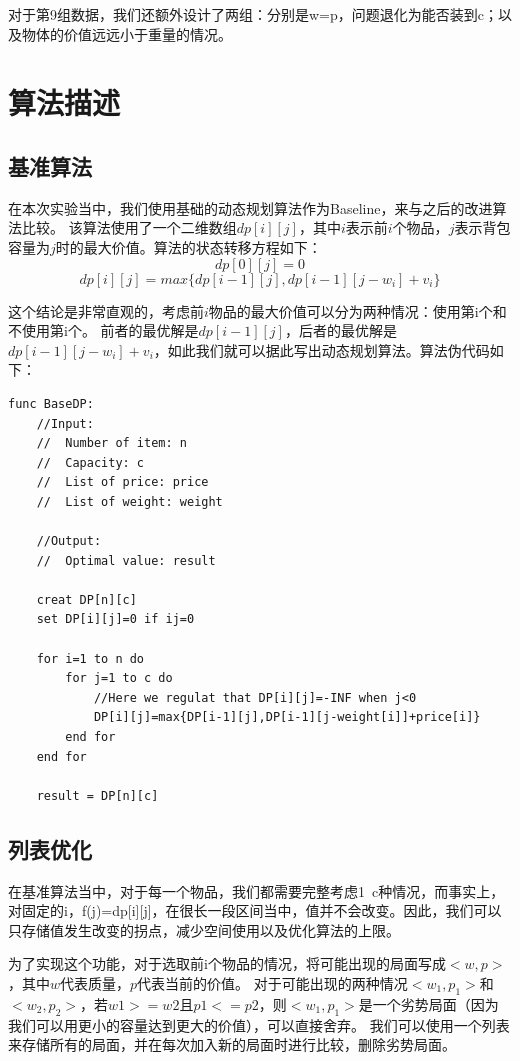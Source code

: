 \documentclass[openany]{book}
\begin{document}
对于第9组数据，我们还额外设计了两组：分别是w=p，问题退化为能否装到c；以及物体的价值远远小于重量的情况。

\chapter{算法描述}
\section{基准算法}
在本次实验当中，我们使用基础的动态规划算法作为Baseline，来与之后的改进算法比较。
该算法使用了一个二维数组$dp[i][j]$，其中$i$表示前$i$个物品，$j$表示背包容量为$j$时的最大价值。算法的状态转移方程如下：
\[
dp[0][j] = 0
\]
\[
dp[i][j] = max\{dp[i-1][j] , dp[i-1][j-w_i] + v_i\}
\]

这个结论是非常直观的，考虑前$i$物品的最大价值可以分为两种情况：使用第i个和不使用第i个。
前者的最优解是$dp[i-1][j]$，后者的最优解是$dp[i-1][j-w_i] + v_i$，如此我们就可以据此写出动态规划算法。算法伪代码如下：

\begin{lstlisting}
func BaseDP:
    //Input: 
    //  Number of item: n
    //  Capacity: c
    //  List of price: price
    //  List of weight: weight 

    //Output:
    //  Optimal value: result

    creat DP[n][c]
    set DP[i][j]=0 if ij=0

    for i=1 to n do
        for j=1 to c do
            //Here we regulat that DP[i][j]=-INF when j<0
            DP[i][j]=max{DP[i-1][j],DP[i-1][j-weight[i]]+price[i]}
        end for
    end for

    result = DP[n][c]

\end{lstlisting}

\section{列表优化}
在基准算法当中，对于每一个物品，我们都需要完整考虑1~c种情况，而事实上，对固定的i，f(j)=dp[i][j]，在很长一段区间当中，值并不会改变。因此，我们可以只存储值发生改变的拐点，减少空间使用以及优化算法的上限。

为了实现这个功能，对于选取前i个物品的情况，将可能出现的局面写成$<w,p>$，其中$w$代表质量，$p$代表当前的价值。
对于可能出现的两种情况$<w_1,p_1>$和$<w_2,p_2>$，若$w1 >= w2$且$p1 <= p2$，则$<w_1,p_1>$是一个劣势局面（因为我们可以用更小的容量达到更大的价值），可以直接舍弃。
我们可以使用一个列表来存储所有的局面，并在每次加入新的局面时进行比较，删除劣势局面。
\end{document}
